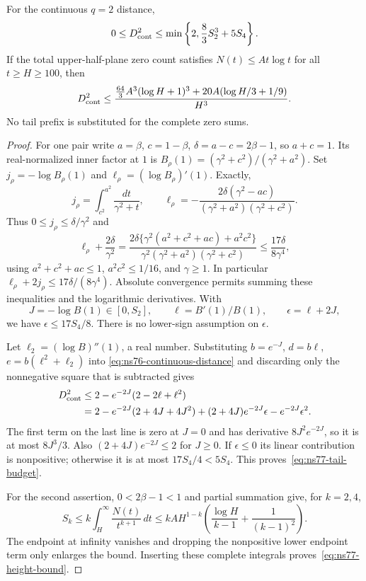 \begin{proposition}
\label{prop:ns77-tail-budget}
For the continuous $q=2$ distance,
\begin{equation}
 0\leq D_{\rm cont}^2\leq
       \min\left\{2,\frac83S_2^3+5S_4\right\}.
 \label{eq:ns77-tail-budget}
\end{equation}
If the total upper-half-plane zero count satisfies
$N(t)\leq A t\log t$ for all $t\geq H\geq100$, then
\begin{equation}
 D_{\rm cont}^2\leq
 \frac{\frac{64}{3}A^3(\log H+1)^3
                  +20A(\log H/3+1/9)}{H^3}.
 \label{eq:ns77-height-bound}
\end{equation}
No tail prefix is substituted for the complete zero sums.
\end{proposition}
\begin{proof}
For one pair write $a=\beta$, $c=1-\beta$, $\delta=a-c=2\beta-1$,
so $a+c=1$. Its real-normalized inner factor at $1$ is
$B_\rho(1)=(\gamma^2+c^2)/(\gamma^2+a^2)$.
Set $j_\rho=-\log B_\rho(1)$ and
$\ell_\rho=(\log B_\rho)'(1)$. Exactly,
\[
 j_\rho=\int_{c^2}^{a^2}\frac{dt}{\gamma^2+t},\qquad
 \ell_\rho=-\frac{2\delta(\gamma^2-ac)}
                        {(\gamma^2+a^2)(\gamma^2+c^2)}.
\]
Thus $0\leq j_\rho\leq\delta/\gamma^2$ and
\[
 \ell_\rho+\frac{2\delta}{\gamma^2}
 =\frac{2\delta\{\gamma^2(a^2+c^2+ac)+a^2c^2\}}
        {\gamma^2(\gamma^2+a^2)(\gamma^2+c^2)}
 \leq\frac{17\delta}{8\gamma^4},
\]
using $a^2+c^2+ac\leq1$, $a^2c^2\leq1/16$, and $\gamma\geq1$.
In particular $\ell_\rho+2j_\rho\leq17\delta/(8\gamma^4)$.
Absolute convergence permits summing these inequalities and the
logarithmic derivatives. With
\[
 J=-\log B(1)\in[0,S_2],\qquad \ell=B'(1)/B(1),
 \qquad \epsilon=\ell+2J,
\]
we have $\epsilon\leq17S_4/8$. There is no lower-sign assumption on
$\epsilon$.

Let $\ell_2=(\log B)''(1)$, a real number. Substituting
$b=e^{-J}$, $d=b\ell$, $e=b(\ell^2+\ell_2)$ into
\eqref{eq:ns76-continuous-distance} and discarding only the
nonnegative square that is subtracted gives
\begin{align*}
 D_{\rm cont}^2
 &\leq 2-e^{-2J}(2-2\ell+\ell^2)\\
 &=2-e^{-2J}(2+4J+4J^2)
       +(2+4J)e^{-2J}\epsilon-e^{-2J}\epsilon^2.
\end{align*}
The first term on the last line is zero at $J=0$ and has derivative
$8J^2e^{-2J}$, so it is at most $8J^3/3$.
Also $(2+4J)e^{-2J}\leq2$ for $J\geq0$. If $\epsilon\leq0$ its
linear contribution is nonpositive; otherwise it is at most
$17S_4/4<5S_4$. This proves~\eqref{eq:ns77-tail-budget}.

For the second assertion, $0<2\beta-1<1$ and partial summation give,
for $k=2,4$,
\[
 S_k\leq k\int_H^\infty\frac{N(t)}{t^{k+1}}\,dt
 \leq kA H^{1-k}
             \left(\frac{\log H}{k-1}+\frac1{(k-1)^2}\right).
\]
The endpoint at infinity vanishes and dropping the nonpositive lower
endpoint term only enlarges the bound. Inserting these complete
integrals proves~\eqref{eq:ns77-height-bound}.
\end{proof}

